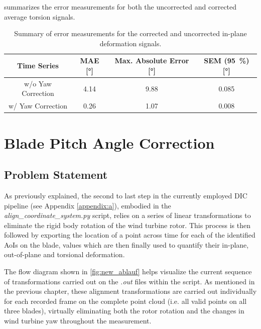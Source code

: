 \documentclass[12pt, a4paper, bibliography=totoc]{scrarticle}
\begin{document}
	 summarizes the error measurements for both the uncorrected and corrected average torsion signals.
	\begin{table}[h]
		\centering
		\begin{tabular}{cccc}
			\toprule
			Time Series & MAE [\unit{\degree}] & Max. Absolute Error [\unit{\degree}] & SEM (\qty{95}{\percent}) [\unit{\degree}] \\
			\midrule
			w/o Yaw Correction & 4.14 & 9.88 & 0.085 \\
			w/ Yaw Correction & 0.26 & 1.07 & 0.008 \\
			\bottomrule
		\end{tabular}
		\caption{Summary of error measurements for the corrected and uncorrected in-plane deformation signals.}
		\label{tab:yaw_error_sum}
	\end{table}
	
	
	
	\section{Blade Pitch Angle Correction}
	
	\subsection{Problem Statement}
	
	As previously explained, the second to last step in the currently employed DIC pipeline (see Appendix \ref{appendix:a}), embodied in the \textit{align\_coordinate\_system.py} script, relies on a series of linear transformations to eliminate
	the rigid body rotation of the wind turbine rotor. This process is then followed by exporting the location of a point across time for each of the identified AoIs on the blade, values which are then finally used to quantify their in-plane, out-of-plane and torsional deformation.
	
	The flow diagram shown in \cref{fig:new_ablauf} helps visualize the current sequence of transformations carried out on the \textit{.out} files within the script. As mentioned in the previous chapter, these alignment transformations are carried out individually for each recorded frame on the complete point cloud (i.e. all valid points on all three blades), virtually eliminating both the rotor rotation and the changes in wind turbine yaw throughout the measurement.
	
\end{document}
